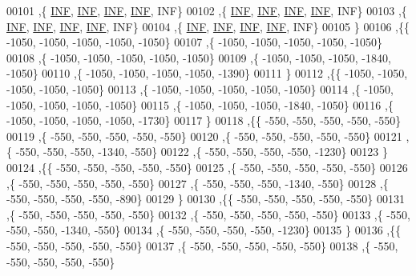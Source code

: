 \begin{DoxyCode}
00101   ,\{   \hyperlink{energy__const_8h_a12c2040f25d8e3a7b9e1c2024c618cb6}{INF},   \hyperlink{energy__const_8h_a12c2040f25d8e3a7b9e1c2024c618cb6}{INF},   \hyperlink{energy__const_8h_a12c2040f25d8e3a7b9e1c2024c618cb6}{INF},   \hyperlink{energy__const_8h_a12c2040f25d8e3a7b9e1c2024c618cb6}{INF},   INF\}
00102   ,\{   \hyperlink{energy__const_8h_a12c2040f25d8e3a7b9e1c2024c618cb6}{INF},   \hyperlink{energy__const_8h_a12c2040f25d8e3a7b9e1c2024c618cb6}{INF},   \hyperlink{energy__const_8h_a12c2040f25d8e3a7b9e1c2024c618cb6}{INF},   \hyperlink{energy__const_8h_a12c2040f25d8e3a7b9e1c2024c618cb6}{INF},   INF\}
00103   ,\{   \hyperlink{energy__const_8h_a12c2040f25d8e3a7b9e1c2024c618cb6}{INF},   \hyperlink{energy__const_8h_a12c2040f25d8e3a7b9e1c2024c618cb6}{INF},   \hyperlink{energy__const_8h_a12c2040f25d8e3a7b9e1c2024c618cb6}{INF},   \hyperlink{energy__const_8h_a12c2040f25d8e3a7b9e1c2024c618cb6}{INF},   INF\}
00104   ,\{   \hyperlink{energy__const_8h_a12c2040f25d8e3a7b9e1c2024c618cb6}{INF},   \hyperlink{energy__const_8h_a12c2040f25d8e3a7b9e1c2024c618cb6}{INF},   \hyperlink{energy__const_8h_a12c2040f25d8e3a7b9e1c2024c618cb6}{INF},   \hyperlink{energy__const_8h_a12c2040f25d8e3a7b9e1c2024c618cb6}{INF},   INF\}
00105   \}
00106  ,\{\{ -1050, -1050, -1050, -1050, -1050\}
00107   ,\{ -1050, -1050, -1050, -1050, -1050\}
00108   ,\{ -1050, -1050, -1050, -1050, -1050\}
00109   ,\{ -1050, -1050, -1050, -1840, -1050\}
00110   ,\{ -1050, -1050, -1050, -1050, -1390\}
00111   \}
00112  ,\{\{ -1050, -1050, -1050, -1050, -1050\}
00113   ,\{ -1050, -1050, -1050, -1050, -1050\}
00114   ,\{ -1050, -1050, -1050, -1050, -1050\}
00115   ,\{ -1050, -1050, -1050, -1840, -1050\}
00116   ,\{ -1050, -1050, -1050, -1050, -1730\}
00117   \}
00118  ,\{\{  -550,  -550,  -550,  -550,  -550\}
00119   ,\{  -550,  -550,  -550,  -550,  -550\}
00120   ,\{  -550,  -550,  -550,  -550,  -550\}
00121   ,\{  -550,  -550,  -550, -1340,  -550\}
00122   ,\{  -550,  -550,  -550,  -550, -1230\}
00123   \}
00124  ,\{\{  -550,  -550,  -550,  -550,  -550\}
00125   ,\{  -550,  -550,  -550,  -550,  -550\}
00126   ,\{  -550,  -550,  -550,  -550,  -550\}
00127   ,\{  -550,  -550,  -550, -1340,  -550\}
00128   ,\{  -550,  -550,  -550,  -550,  -890\}
00129   \}
00130  ,\{\{  -550,  -550,  -550,  -550,  -550\}
00131   ,\{  -550,  -550,  -550,  -550,  -550\}
00132   ,\{  -550,  -550,  -550,  -550,  -550\}
00133   ,\{  -550,  -550,  -550, -1340,  -550\}
00134   ,\{  -550,  -550,  -550,  -550, -1230\}
00135   \}
00136  ,\{\{  -550,  -550,  -550,  -550,  -550\}
00137   ,\{  -550,  -550,  -550,  -550,  -550\}
00138   ,\{  -550,  -550,  -550,  -550,  -550\}

\end{DoxyCode}
